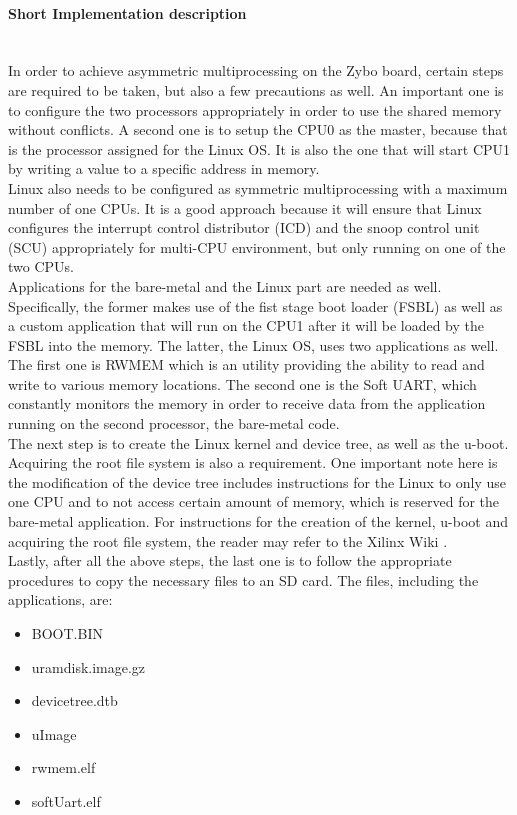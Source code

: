 \paragraph{Short Implementation description}~\\
In order to achieve asymmetric multiprocessing on the Zybo board, certain steps are required to be taken, but also a few precautions as well.
An important one is to configure the two processors appropriately in order to use the shared memory without conflicts.
A second one is to setup the CPU0 as the master, because that is the processor assigned for the Linux OS.
It is also the one that will start CPU1 by writing a value to a specific address in memory.
\\
Linux also needs to be configured as symmetric multiprocessing with a maximum number of one CPUs.
It is a good approach because it will ensure that Linux configures the interrupt control distributor (ICD) and the snoop control unit (SCU) appropriately for multi-CPU environment, but only running on one of the two CPUs.
\\
Applications for the bare-metal and the Linux part are needed as well. Specifically, the former makes use of the fist stage boot loader (FSBL) as well as a custom application that will run on the CPU1 after it will be loaded by the FSBL into the memory.
The latter, the Linux OS, uses two applications as well.
The first one is RWMEM which is an utility providing the ability to read and write to various memory locations.
The second one is the Soft UART, which constantly monitors the memory in order to receive data from the application running on the second processor, the bare-metal code.
\\
The next step is to create the Linux kernel and device tree, as well as the u-boot.
Acquiring the root file system is also a requirement.
One important note here is the modification of the device tree includes instructions for the Linux to only use one CPU and to not access certain amount of memory, which is reserved for the bare-metal application.
For instructions for the creation of the kernel, u-boot and acquiring the root file system, the reader may refer to the Xilinx Wiki \cite{Xilinx_wiki}.
\\
Lastly, after all the above steps, the last one is to follow the appropriate procedures to copy the necessary files to an SD card. The files, including the applications, are:
\begin{itemize}
\item BOOT.BIN
\item uramdisk.image.gz
\item devicetree.dtb
\item uImage
\item rwmem.elf
\item softUart.elf
\end{itemize}

